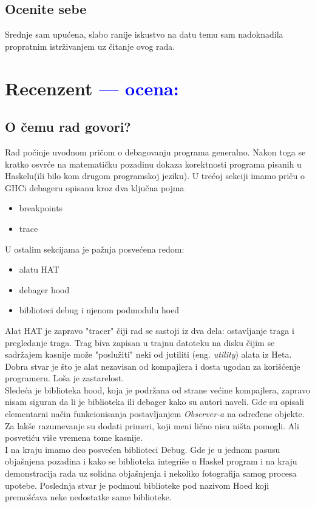 \documentclass[a4paper]{report}
\newcommand{\odgovor}[1]{\textcolor{blue}{#1}}
\begin{document}
\section{Ocenite sebe}

Srednje sam upućena, slabo ranije iskustvo na datu temu sam nadoknadila propratnim istrživanjem uz čitanje ovog rada.

\chapter{Recenzent \odgovor{--- ocena:} }


\section{O čemu rad govori?}
Rad počinje uvodnom pričom o debagovanju programa generalno. Nakon toga se kratko osvrće na matematičku 
pozadinu dokaza korektnosti programa pisanih u Haskelu(ili bilo kom drugom programskoj jeziku).
U trećoj sekciji imamo priču o GHCi debageru opisanu kroz dva ključna pojma 
\begin{itemize}
 	\item breakpoints
 	\item trace
\end{itemize}
U ostalim sekcijama je pažnja posvećena redom:
\begin{itemize}
	\item alatu HAT
	\item debager hood
	\item biblioteci debug i njenom podmodulu hoed
\end{itemize}
Alat HAT je zapravo "tracer" čiji rad se sastoji iz dva dela: ostavljanje traga i pregledanje traga.
Trag biva zapisan u trajnu datoteku na disku čijim se sadržajem kasnije može "poslužiti" neki od
jutiliti (eng. \emph{utility}) alata iz Heta.
Dobra stvar je što je alat nezavisan od kompajlera i dosta ugodan za korišćenje programeru.
Loša je zastarelost. 
\\ 
Sledeća je biblioteka hood, koja je podržana od strane većine kompajlera, zapravo nisam siguran da li je biblioteka ili debager
kako su autori naveli. Gde su opisali elementarni način funkcionisanja postavljanjem \emph{Observer-a} na određene
objekte. Za lakše razumevanje su dodati primeri, koji meni lično nisu ništa pomogli. Ali posvetiću više vremena tome kasnije.
\\
I na kraju imamo deo posvećen biblioteci Debug. Gde je u jednom pasusu objašnjena pozadina i kako se biblioteka
integriše u Haskel program i na kraju demonstracija rada uz solidna objašnjenja i nekoliko fotografija samog procesa
upotebe. Poslednja stvar je podmoul biblioteke pod nazivom Hoed koji premošćava neke nedostatke same biblioteke.
\end{document}
